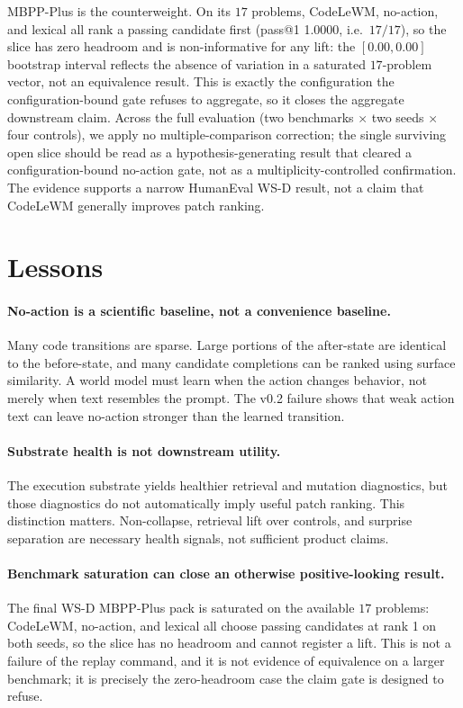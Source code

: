 \documentclass[11pt]{article}
\newcommand{\modelname}{CodeLeWM}
\begin{document}
MBPP-Plus is the counterweight. On its $17$ problems, \modelname{}, no-action,
and lexical all rank a passing candidate first (pass@1 1.0000, i.e.\ $17/17$), so
the slice has zero headroom and is non-informative for any lift: the
$[0.00, 0.00]$ bootstrap interval reflects the absence of variation in a saturated
$17$-problem vector, not an equivalence result. This is exactly the configuration
the configuration-bound gate refuses to aggregate, so it closes the aggregate
downstream claim. Across the full evaluation (two benchmarks $\times$ two seeds
$\times$ four controls), we apply no multiple-comparison correction; the single
surviving open slice should be read as a hypothesis-generating result that cleared
a configuration-bound no-action gate, not as a multiplicity-controlled
confirmation. The evidence supports a narrow HumanEval WS-D result, not a claim
that \modelname{} generally improves patch ranking.

\section{Lessons}

\paragraph{No-action is a scientific baseline, not a convenience baseline.}
Many code transitions are sparse. Large portions of the after-state are
identical to the before-state, and many candidate completions can be ranked
using surface similarity. A world model must learn when the action changes
behavior, not merely when text resembles the prompt. The v0.2 failure shows
that weak action text can leave no-action stronger than the learned transition.

\paragraph{Substrate health is not downstream utility.}
The execution substrate yields healthier retrieval and mutation diagnostics,
but those diagnostics do not automatically imply useful patch ranking. This
distinction matters. Non-collapse, retrieval lift over controls, and surprise
separation are necessary health signals, not sufficient product claims.

\paragraph{Benchmark saturation can close an otherwise positive-looking result.}
The final WS-D MBPP-Plus pack is saturated on the available $17$ problems:
CodeLeWM, no-action, and lexical all choose passing candidates at rank 1 on both
seeds, so the slice has no headroom and cannot register a lift. This is not a
failure of the replay command, and it is not evidence of equivalence on a larger
benchmark; it is precisely the zero-headroom case the claim gate is designed to
refuse.
\end{document}
